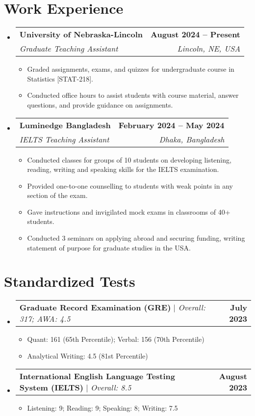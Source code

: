 \documentclass[letterpaper,11pt]{article}
\makeatletter
\newcommand{\resumeItem}[1]{
  \item\small{
    {#1 \vspace{-2pt}}
  }
}
\newcommand{\resumeSubheading}[4]{
  \vspace{-2pt}\item
    \begin{tabular*}{1.0\textwidth}[t]{l@{\extracolsep{\fill}}r}
      \textbf{#1} & \textbf{\small #2} \\
      \textit{\small#3} & \textit{\small #4} \\
    \end{tabular*}\vspace{-7pt}
}
\newcommand{\resumeProjectHeading}[2]{
    \item
    \begin{tabular*}{1.001\textwidth}{l@{\extracolsep{\fill}}r}
      \small#1 & \textbf{\small #2}\\
    \end{tabular*}\vspace{-7pt}
}
\newcommand{\resumeSubHeadingListStart}{\begin{itemize}[leftmargin=0.0in, label={}]}
\newcommand{\resumeSubHeadingListEnd}{\end{itemize}}
\newcommand{\resumeItemListStart}{\begin{itemize}}
\newcommand{\resumeItemListEnd}{\end{itemize}\vspace{-5pt}}
\makeatother
\begin{document}
\section{Work Experience}
  \resumeSubHeadingListStart
      \resumeSubheading
      {University of Nebraska-Lincoln}{August 2024 -- Present}
      {Graduate Teaching Assistant}{Lincoln, NE, USA}
      \resumeItemListStart
        \resumeItem{Graded assignments, exams, and quizzes for undergraduate course in Statistics [STAT-218].}
        \resumeItem{Conducted office hours to assist students with course material, answer questions, and provide guidance on assignments.}
      \resumeItemListEnd
    \resumeSubheading
      {Luminedge Bangladesh}{February 2024 -- May 2024}
      {IELTS Teaching Assistant}{Dhaka, Bangladesh}
      \resumeItemListStart
        \resumeItem{Conducted classes for groups of 10 students on developing listening, reading, writing and speaking skills for the IELTS examination.}
        \resumeItem{Provided one-to-one counselling to students with weak points in any section of the exam.}
        \resumeItem{Gave instructions and invigilated mock exams in classrooms of 40+ students.}
        \resumeItem{Conducted 3 seminars on applying abroad and securing funding, writing statement of purpose for graduate studies in the USA.}
      \resumeItemListEnd
  \resumeSubHeadingListEnd


\section{Standardized Tests}
    \vspace{-5pt}
    \resumeSubHeadingListStart
      \resumeProjectHeading
          {\textbf{Graduate Record Examination (GRE)} $|$ \emph{Overall: 317; AWA: 4.5}}{July 2023}
          \resumeItemListStart
            \resumeItem{Quant: 161 (65th Percentile); Verbal: 156 (70th Percentile)}
            \resumeItem{Analytical Writing: 4.5 (81st Percentile)}
          \resumeItemListEnd
          \vspace{-13pt}
      \resumeProjectHeading
          {\textbf{International English Language Testing System (IELTS)} $|$ \emph{Overall: 8.5}}{August 2023}
          \resumeItemListStart
            \resumeItem{Listening: 9; Reading: 9; Speaking: 8; Writing: 7.5}
          \resumeItemListEnd 
    \resumeSubHeadingListEnd
\vspace{-15pt}

\end{document}
